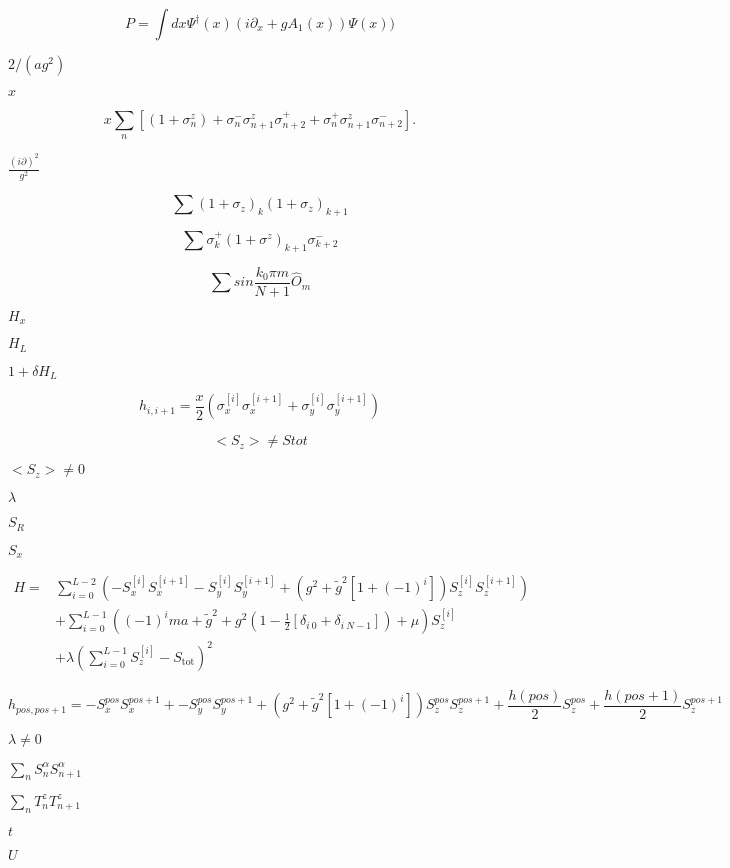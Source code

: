\documentclass{article}
\begin{document}
\[P=\int dx
\Psi^{\dagger}(x)(i \partial_x+g A_1(x))\Psi(x))\]
\pagebreak

$2/(a g^2)$
\pagebreak

$x$
\pagebreak

\[x \sum_n [(1+\sigma_n^z) +\sigma_{n}^-\sigma_{n+1}^z \sigma_{n+2}^+ +
\sigma_{n}^+\sigma_{n+1}^z \sigma_{n+2}^- ].\]
\pagebreak

$\frac{(i\partial)^2}{g^2}$
\pagebreak

\[\sum (1+\sigma_z)_k (1+\sigma_z)_{k+1}\]
\pagebreak

\[\sum \sigma^+_k (1+\sigma^z)_{k+1} \sigma^-_{k+2} \]
\pagebreak

\[\sum sin\frac{k_0 \pi
m}{N+1} \hat{O}_m \]
\pagebreak

$H_x$
\pagebreak

$H_L$
\pagebreak

$1+\delta H_L$
\pagebreak

\[ h_{i,i+1}= 
\frac{x}{2}
(\sigma_{x}^{[i]} \sigma_{x}^{[i+1]} + \sigma_{y}^{[i]}
\sigma_{y}^{[i+1]} )\]
\pagebreak

\[<S_z>\neq Stot\]
\pagebreak

$<S_z>\neq 0$
\pagebreak

$\lambda$
\pagebreak

$S_R$
\pagebreak

$S_x$
\pagebreak

\begin{eqnarray*} 
H=&\sum_{i=0}^{L-2} \left ( -S_x^{[i]}S_x^{[i+1]}-S_y^{[i]}S_y^{[i+1]} + \left(g^2+\tilde{g}^2[1+(-1)^i]\right) S_z^{[i]}S_z^{[i+1]} \right)\\
&+ \sum_{i=0}^{L-1} \left( (-1)^i ma +\tilde{g}^2 +g^2(1-\frac{1}{2}[\delta_{i\ 0}+\delta_{i\ N-1}])+\mu \right) S_z^{[i]}\\
&+\lambda \left ( \sum_{i=0}^{L-1} S_z^{[i]}-S_{\mathrm{tot}}\right)^2
\end{eqnarray*}
\pagebreak

\[
h_{pos,pos+1}=- S_x^{pos} S_x^{pos+1} +
- S_y^{pos} S_y^{pos+1}+
\left(g^2+\tilde{g}^2[1+(-1)^i]\right) S_z^{pos} S_z^{pos+1}+
\frac{h({pos})}{2} S_z^{pos} +
\frac{h({pos+1})}{2} S_z^{pos+1}
\]
\pagebreak

$\lambda \neq 0$
\pagebreak

$\sum_n S_n^{\alpha}S_{n+1}^{\alpha}$
\pagebreak

$\sum_n T_{n}^{z}T_{n+1}^{z}$
\pagebreak

$t$
\pagebreak

$U$
\pagebreak
\end{document}
